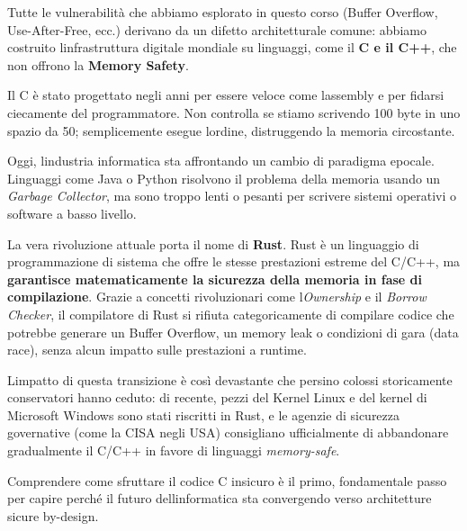 \documentclass[11pt,a4paper]{article}
\begin{document}
Tutte le vulnerabilità che abbiamo esplorato in questo corso (Buffer
Overflow, Use-After-Free, ecc.) derivano da un difetto architetturale
comune: abbiamo costruito l\textquotesingle infrastruttura digitale
mondiale su linguaggi, come il \textbf{C e il C++}, che non offrono la
\textbf{Memory Safety}.

Il C è stato progettato negli anni  per essere veloce
come l\textquotesingle assembly e per fidarsi ciecamente del
programmatore. Non controlla se stiamo scrivendo 100 byte in uno spazio
da 50; semplicemente esegue l\textquotesingle ordine, distruggendo la
memoria circostante.

Oggi, l\textquotesingle industria informatica sta affrontando un cambio
di paradigma epocale. Linguaggi come Java o Python risolvono il problema
della memoria usando un \emph{Garbage Collector}, ma sono troppo lenti o
pesanti per scrivere sistemi operativi o software a basso livello.

La vera rivoluzione attuale porta il nome di \textbf{Rust}. Rust è un
linguaggio di programmazione di sistema che offre le stesse prestazioni
estreme del C/C++, ma \textbf{garantisce matematicamente la sicurezza
della memoria in fase di compilazione}. Grazie a concetti rivoluzionari
come l\textquotesingle{}\emph{Ownership} e il \emph{Borrow Checker}, il
compilatore di Rust si rifiuta categoricamente di compilare codice che
potrebbe generare un Buffer Overflow, un memory leak o condizioni di
gara (data race), senza alcun impatto sulle prestazioni a runtime.

L\textquotesingle impatto di questa transizione è così devastante che
persino colossi storicamente conservatori hanno ceduto: di recente,
pezzi del Kernel Linux e del kernel di Microsoft Windows sono stati
riscritti in Rust, e le agenzie di sicurezza governative (come la CISA
negli USA) consigliano ufficialmente di abbandonare gradualmente il
C/C++ in favore di linguaggi \emph{memory-safe}.

Comprendere come sfruttare il codice C insicuro è il primo, fondamentale
passo per capire perché il futuro dell\textquotesingle informatica sta
convergendo verso architetture sicure by-design.
\end{document}
